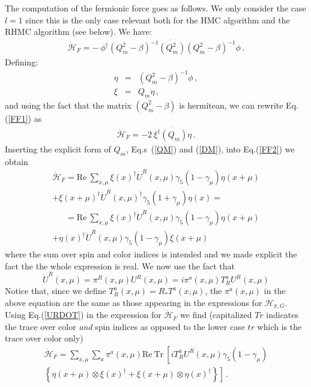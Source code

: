 \documentclass{article}[12pt]
\begin{document}
The computation of the fermionic force goes as follows. We only consider the case $l=1$ since this is the
only case relevant both for the HMC algorithm and the RHMC algorithm (see below). We have:
\begin{eqnarray}
\dot{\mathcal{H}}_F = -\ \phi^\dagger (Q_m^2 - \beta)^{-1} \dot{(Q_m^2)} (Q_m^2 - \beta)^{-1} \phi \, . \label{FF1}
\end{eqnarray}
Defining:
\begin{eqnarray}
\eta &=& (Q_m^2 - \beta)^{-1} \phi \, , \label{HMCETA}\\
\xi &=& Q_m \eta \, ,
\end{eqnarray}
and using the fact that the matrix $(Q_m^2-\beta)$ is hermitean, we can rewrite Eq.(\ref{FF1}) as
\begin{eqnarray}
\dot{\mathcal{H}}_F = - 2 \ \xi^\dagger \dot{(Q_m)} \eta \, . \label{FF2}
\end{eqnarray}
Inserting the explicit form of $Q_m$, Eq.s~(\ref{QM}) and (\ref{DM}), into Eq.(\ref{FF2}) we obtain
\begin{multline}
\dot{\mathcal{H}}_F = \mathrm{Re\ }\sum_{x,\mu} \xi(x)^\dagger \dot U^R(x,\mu) \gamma_5 (1-\gamma_\mu) \eta(x+\mu) \\
+ \xi(x+\mu)^\dagger \dot U^R(x,\mu)^\dagger \gamma_5 (1+\gamma_\mu) \eta(x) = \nonumber
\end{multline}
\begin{multline}
\phantom{\dot{\mathcal{H}}_F} = \mathrm{Re\ }\sum_{x,\mu} \xi(x)^\dagger \dot U^R(x,\mu) \gamma_5 (1-\gamma_\mu) \eta(x+\mu) \\
+ \eta(x)^\dagger \dot U^R(x,\mu) \gamma_5 (1-\gamma_\mu) \xi(x+\mu)
\end{multline}
where the sum over spin and color indices is intended and we made explicit the fact the the whole
expression is real.
We now use the fact that
\begin{equation}
\dot U^R (x,\mu) = \pi^R(x,\mu) U^R(x,\mu) = i \pi^a(x,\mu) T^a_R U^R(x,\mu) \label{URDOT}
\end{equation}
Notice that, since we define $T^a_R(x,\mu) = R_* T^a(x,\mu)$, the $\pi^a(x,\mu)$ in the above
equation are the same as those appearing in the expressions for $\dot{\mathcal{H}}_{\pi,G}$.
Using Eq.(\ref{URDOT}) in the expression for $\dot{\mathcal{H}}_{F}$ we find
(capitalized $Tr$ indicates the trace over color \textit{and} spin indices as opposed to the lower
 case $tr$ which is the trace over color only)
\begin{multline}
\dot{\mathcal{H}}_F = \sum_{x,\mu} \sum_a \pi^a(x,\mu) \mathrm{Re\ Tr\ } \left[ iT^a_R U^R(x,\mu) \gamma_5 (1-\gamma_\mu) \right. \\
		\left. \left\{ \eta(x+\mu)\otimes\xi(x)^\dagger + \xi(x+\mu)\otimes\eta(x)^\dagger \right\} \right] \, . \label{HDOTF}
\end{multline}
\end{document}
